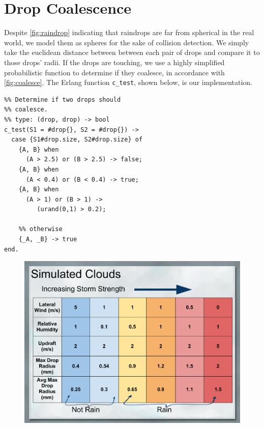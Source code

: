 \documentclass[twocolumn,a4paper,10pt]{article}
\begin{document}
\section{Drop Coalescence}

Despite \autoref{fig:raindrop} indicating that raindrops are far from spherical
in the real world, we model them as spheres for the sake of collision detection.
We simply take the euclidean distance between between each pair of drops and
compare it to those drops' radii. If the drops are touching, we use a highly
simplified probabilistic function to determine if they coalesce, in accordance
with \autoref{fig:coalesce}. The Erlang function \texttt{c\_test}, shown below,
is our implementation.
\begin{verbatim}
%% Determine if two drops should
%% coalesce.
%% type: (drop, drop) -> bool
c_test(S1 = #drop{}, S2 = #drop{}) ->
  case {S1#drop.size, S2#drop.size} of
    {A, B} when
      (A > 2.5) or (B > 2.5) -> false;
    {A, B} when
      (A < 0.4) or (B < 0.4) -> true;
    {A, B} when
      (A > 1) or (B > 1) ->
         (urand(0,1) > 0.2);

    %% otherwise
    {_A, _B} -> true
end.
\end{verbatim}


\begin{figure}[h]
    \centering
    \includegraphics[width=0.75\linewidth]{rain_size_table.pdf}
\end{figure}


\FloatBarrier


\nocite{*}


\end{document}
